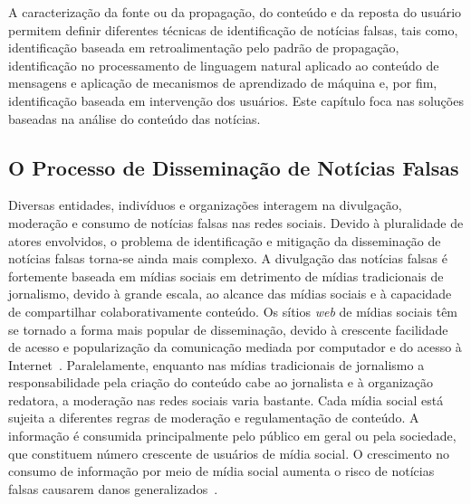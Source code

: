\documentclass{SBCbookchapter}
\begin{document}
A caracterização da fonte ou da propagação, do conteúdo e da reposta do usuário permitem definir diferentes técnicas de identificação de notícias falsas, tais como, identificação baseada em retroalimentação pelo padrão de propagação, identificação no processamento de linguagem natural aplicado ao conteúdo de mensagens e aplicação de mecanismos de aprendizado de máquina e, por fim, identificação baseada em intervenção dos usuários. Este capítulo foca nas soluções baseadas na análise do conteúdo das notícias.

\subsection{O Processo de Disseminação de Notícias Falsas}

Diversas entidades, indivíduos e organizações interagem na divulgação, moderação e consumo de notícias falsas nas redes sociais. Devido à pluralidade de atores envolvidos, o problema de identificação e mitigação da disseminação de notícias falsas torna-se ainda mais complexo. A divulgação das notícias falsas é fortemente baseada em mídias sociais em detrimento de mídias tradicionais de jornalismo, devido à grande escala, ao alcance das mídias sociais e à capacidade de compartilhar colaborativamente conteúdo. Os sítios \textit{web} de mídias sociais têm se tornado a forma mais popular de disseminação, devido à crescente facilidade de acesso e popularização da comunicação mediada por computador e do acesso à Internet~\cite{Mattos2019}. Paralelamente, enquanto nas mídias tradicionais de jornalismo a responsabilidade pela criação do conteúdo cabe ao jornalista e à organização redatora, a moderação nas redes sociais varia bastante. Cada mídia social está sujeita a diferentes regras de moderação e regulamentação de conteúdo. A informação é consumida principalmente pelo público em geral ou pela sociedade, que constituem número crescente de usuários de mídia social. O crescimento no consumo de informação por meio de mídia social aumenta o risco de notícias falsas causarem danos generalizados~\cite{sharma2019combating}.
\end{document}
